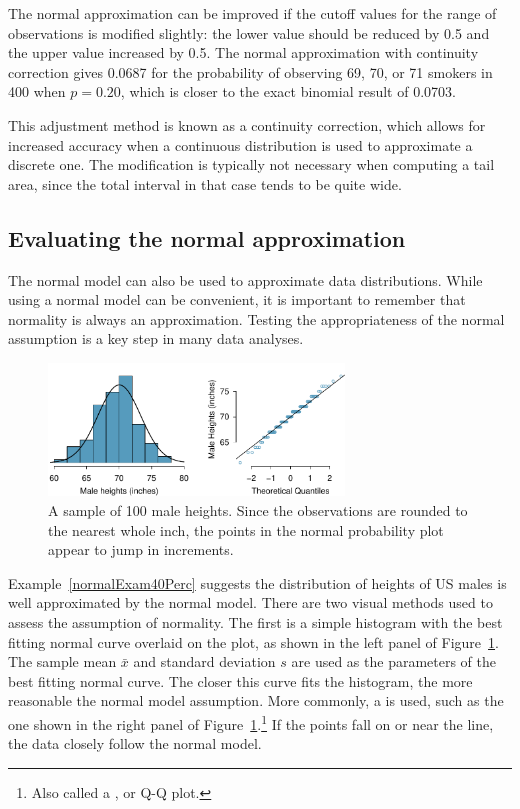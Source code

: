 The normal approximation can be improved if the cutoff values for the range of observations is modified slightly: the lower value should be reduced by 0.5 and the upper value increased by 0.5. The normal approximation with continuity correction gives 0.0687 for the probability of observing 69, 70, or 71 smokers in 400 when $p = 0.20$, which is closer to the exact binomial result of 0.0703. 

This adjustment method is known as a continuity correction, which allows for increased accuracy when a continuous distribution is used to approximate a discrete one. The modification is typically not necessary when computing a tail area, since the total interval in that case tends to be quite wide.
	


\subsection{Evaluating the normal approximation}
\label{assessingNormal}

The normal model can also be used to approximate data distributions. While using a normal model can be convenient, it is important to remember that normality is always an approximation. Testing the appropriateness of the normal assumption is a key step in many data analyses.


\begin{figure}[h!]
	\centering
	\includegraphics[width=0.7\textwidth]{ch_distributions_oi_biostat/figures/fcidMHeights/fcidMHeights}
	\caption{A sample of 100 male heights. Since the observations are rounded to the nearest whole inch, the points in the normal probability plot appear to jump in increments.}
	\label{fcidMHeights}
\end{figure}

Example~\ref{normalExam40Perc} suggests the distribution of heights of US males is well approximated by the normal model. There are two visual methods used to assess the assumption of normality. The first is a simple histogram with the best fitting normal curve overlaid on the plot, as shown in the left panel of Figure~\ref{fcidMHeights}. The sample mean $\bar{x}$ and standard deviation $s$ are used as the parameters of the best fitting normal curve. The closer this curve fits the histogram, the more reasonable the normal model assumption. More commonly, a  is used, such as the one shown in the right panel of Figure~\ref{fcidMHeights}.\footnote{Also called a , or Q-Q plot.} If the points fall on or near the line, the data closely follow the normal model.

